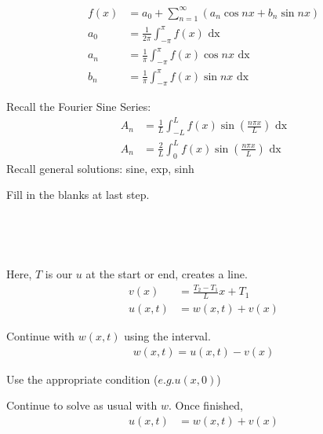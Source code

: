 \documentclass{article}
\begin{document}
\begin{multicols}{2}
  \begin{align*}
    f(x) & =
    a_0 +
    \sum^\infty_{n = 1}
    (a_n \cos nx + b_n \sin nx)\\
    a_0 & =
    \frac{1}{2 \pi}
    \int^\pi_{-\pi}
    f(x)
    \text{ dx}\\
    a_n & =
    \frac{1}{\pi}
    \int^\pi_{-\pi}
    f(x) \cos nx
    \text{ dx}\\
    b_n & =
    \frac{1}{\pi}
    \int^\pi_{-\pi}
    f(x) \sin nx
    \text{ dx}
  \end{align*}

Recall the Fourier Sine Series:
\begin{align*}
  A_n & = \frac{1}{L}\int^L_{-L} f(x) \sin\left(\frac{n \pi x}{L}\right)\text{ dx}\\
  A_n & = \frac{2}{L}\int^L_0 f(x) \sin\left(\frac{n \pi x}{L}\right)\text{ dx}
\end{align*}
Recall general solutions: sine, exp, sinh

Fill in the blanks at last step.

\

\


Here, $T$ is our $u$ at the start or end, creates a line.
\begin{align*}
  v(x) & = \frac{T_2 - T_1}{L}x + T_1\\
  u(x, t) & = w(x, t) + v(x)
\end{align*}

Continue with $w(x, t)$ using the interval.
\begin{align*}
  w(x, t) = u(x, t) - v(x)
\end{align*}

Use the appropriate condition ($e.g. u(x, 0)$)

Continue to solve as usual with $w$. Once finished,
\begin{align*}
  u(x, t) & = w(x, t) + v(x)
\end{align*}


\end{multicols}
\end{document}
